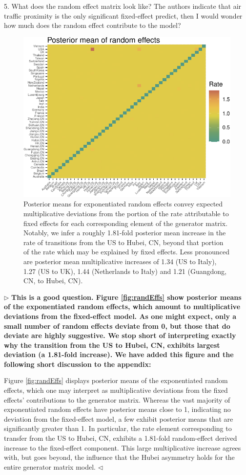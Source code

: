 \documentclass[12pt]{article}
\newenvironment{reply}{$\triangleright$\bfseries}{$\triangleleft$}
\renewenvironment{quote}
               {\list{}{\rightmargin\leftmargin}%
                \item\relax\normalfont}
               {\endlist}
\begin{document}
5. What does the random effect matrix look like? The authors indicate that air traffic proximity is the only significant fixed-effect predict, then I would wonder how much does the random effect contribute to the model?




\setcounter{figure}{4}
\begin{figure}[t]
	\centering
	\includegraphics[width=0.7\linewidth]{figures/randEffects.pdf}
	\caption{Posterior means for exponentiated random effects convey expected multiplicative deviations from the portion of the rate attributable to fixed effects for each corresponding element of the generator matrix.  Notably, we infer a roughly 1.81-fold posterior mean increase in the rate of transitions from the US to Hubei, CN, beyond that portion of the rate which may be explained by fixed effects.  Less pronounced are posterior mean multiplicative increases of 1.34 (US to Italy), 1.27 (US to UK), 1.44 (Netherlands to Italy) and 1.21 (Guangdong, CN, to Hubei, CN).}%
\end{figure}

\begin{reply}
This is a good question.  Figure \ref{fig:randEffs} show posterior means of the exponentiated random effects, which amount to multiplicative deviations from the fixed-effect model.  As one might expect, only a small number of random effects deviate from 0, but those that do deviate are highly suggestive.  We stop short of interpreting exactly why the transition from the US to Hubei, CN, exhibits largest deviation (a 1.81-fold increase).  We have added this figure and the following short discussion to the appendix:
	\begin{quote}
		Figure \ref{fig:randEffs} displays posterior means of the exponentiated random effects, which one may interpret as multiplicative deviations from the fixed effects' contributions to the generator matrix.  Whereas the vast majority of exponentiated random effects have posterior means close to 1, indicating no deviation from the fixed-effect model, a few exhibit posterior means that are significantly greater than 1.  In particular, the rate element corresponding to transfer from the US to Hubei, CN, exhibits a 1.81-fold random-effect derived increase to the fixed-effect component.  This large multiplicative increase agrees with, but goes beyond, the influence that the Hubei asymmetry holds for the entire generator matrix model. 
	\end{quote}	
\end{reply}
\end{document}
